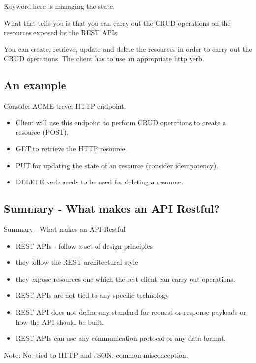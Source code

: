 \begin{note}
    Keyword here is managing the state.
\end{note}

What that tells you is that you can carry out the CRUD operations on the resources exposed by the REST APIs.

You can create, retrieve, update and delete the resources in order to carry out the CRUD operations.
The client has to use an appropriate http verb.

\subsection{An example}
Consider ACME travel HTTP endpoint.
\begin{itemize}
    \item Client will use this endpoint to perform CRUD operations to create a resource (POST).
    \item GET to retrieve the HTTP resource.
    \item PUT for updating the state of an resource (consider idempotency).
    \item DELETE verb needs to be used for deleting a resource.
\end{itemize}

\subsection{Summary - What makes an API Restful?}
Summary - What makes an API Restful
\begin{itemize}
    \item REST APIs - follow a set of design principles
    \item they follow the REST architectural style
    \item they expose resources one which the rest client can carry out operations.
    \item REST APIs are not tied to any specific technology
    \item REST API does not define any standard for request or response payloads or how the API should be built.
    \item REST APIs can use any communication protocol or any data format.
\end{itemize}

\begin{note}
    Note: Not tied to HTTP and JSON, common misconception.
\end{note}


